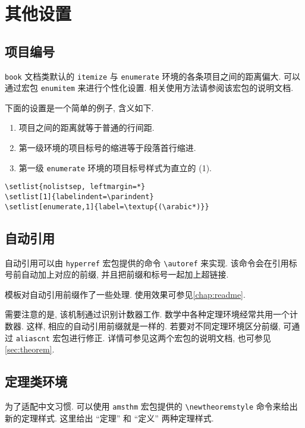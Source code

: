 \chapter{其他设置}
\label{chap:other}

\section{项目编号}

\verb|book| 文档类默认的 \verb|itemize| 与 \verb|enumerate| 环境的各条项目之间的距离偏大. 可以通过宏包 \verb|enumitem| 来进行个性化设置. 相关使用方法请参阅该宏包的说明文档.

下面的设置是一个简单的例子, 含义如下.
\begin{enumerate}
  \item
    项目之间的距离就等于普通的行间距.
  \item
    第一级环境的项目标号的缩进等于段落首行缩进.
  \item
    第一级 \verb|enumerate| 环境的项目标号样式为直立的 (1).
\end{enumerate}

\begin{verbatim}
\setlist{nolistsep, leftmargin=*}
\setlist[1]{labelindent=\parindent}
\setlist[enumerate,1]{label=\textup{(\arabic*)}}
\end{verbatim}

\section{自动引用}

自动引用可以由 \verb|hyperref| 宏包提供的命令 \verb|\autoref| 来实现.
该命令会在引用标号前自动加上对应的前缀, 并且把前缀和标号一起加上超链接.

模板对自动引用前缀作了一些处理.
使用效果可参见\autoref{chap:readme}.

需要注意的是, 该机制通过识别计数器工作.
数学中各种定理环境经常共用一个计数器. 这样, 相应的自动引用前缀就是一样的.
若要对不同定理环境区分前缀, 可通过 \verb|aliascnt| 宏包进行修正.
详情可参见这两个宏包的说明文档, 也可参见\autoref{sec:theorem}.

\section{定理类环境}
\label{sec:theorem}

为了适配中文习惯. 可以使用 \verb|amsthm| 宏包提供的 \verb|\newtheoremstyle| 命令来给出新的定理样式.
这里给出 ``定理'' 和 ``定义'' 两种定理样式.

